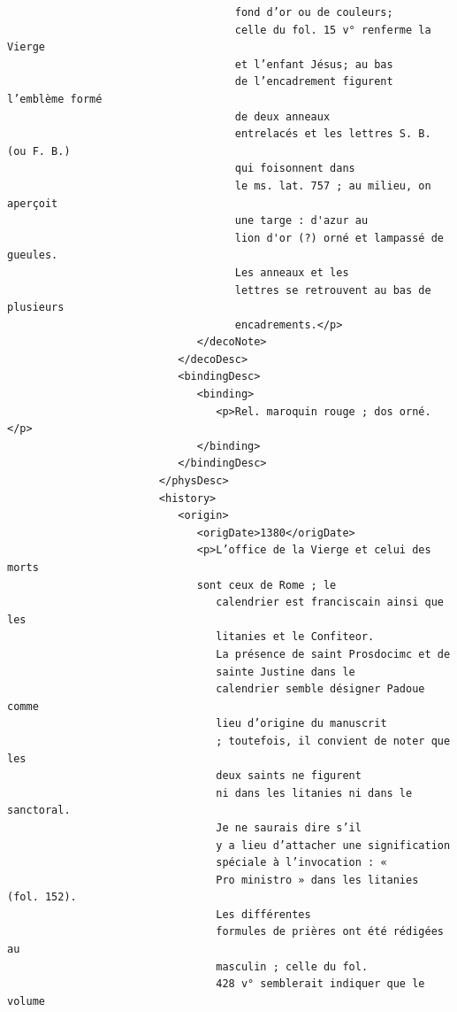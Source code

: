 \documentclass[a4paper,12pt,twoside]{book}
\begin{document}
\begin{verbatim}
                                    fond d’or ou de couleurs;
                                    celle du fol. 15 v° renferme la Vierge
                                    et l’enfant Jésus; au bas
                                    de l’encadrement figurent l’emblème formé 
                                    de deux anneaux
                                    entrelacés et les lettres S. B. (ou F. B.)
                                    qui foisonnent dans
                                    le ms. lat. 757 ; au milieu, on aperçoit
                                    une targe : d'azur au
                                    lion d'or (?) orné et lampassé de gueules.
                                    Les anneaux et les
                                    lettres se retrouvent au bas de plusieurs 
                                    encadrements.</p>
                              </decoNote>
                           </decoDesc>
                           <bindingDesc>
                              <binding>
                                 <p>Rel. maroquin rouge ; dos orné.</p>
                              </binding>
                           </bindingDesc>
                        </physDesc>
                        <history>
                           <origin>
                              <origDate>1380</origDate>
                              <p>L’office de la Vierge et celui des morts 
                              sont ceux de Rome ; le
                                 calendrier est franciscain ainsi que les 
                                 litanies et le Confiteor.
                                 La présence de saint Prosdocimc et de 
                                 sainte Justine dans le
                                 calendrier semble désigner Padoue comme 
                                 lieu d’origine du manuscrit
                                 ; toutefois, il convient de noter que les
                                 deux saints ne figurent
                                 ni dans les litanies ni dans le sanctoral. 
                                 Je ne saurais dire s’il
                                 y a lieu d’attacher une signification 
                                 spéciale à l’invocation : «
                                 Pro ministro » dans les litanies (fol. 152).
                                 Les différentes
                                 formules de prières ont été rédigées au 
                                 masculin ; celle du fol.
                                 428 v° semblerait indiquer que le volume

\end{verbatim}
\end{document}
